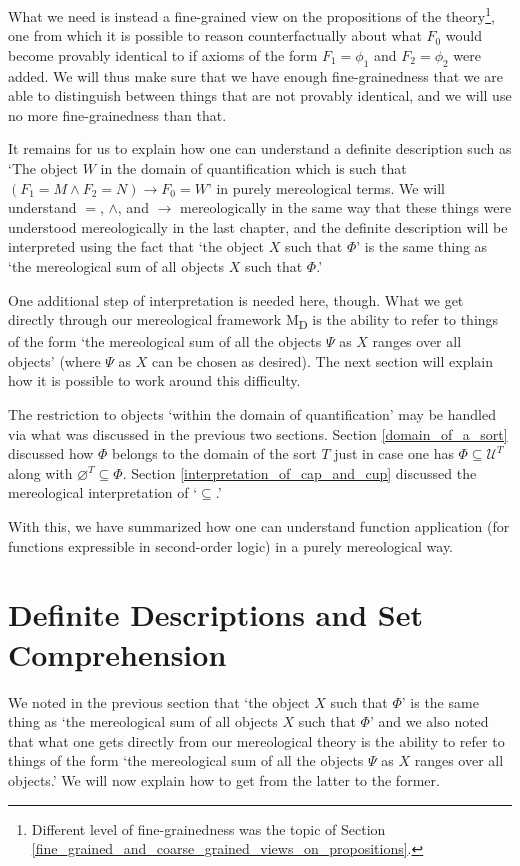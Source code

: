 \documentclass[12pt]{book}
\begin{document}
What we need is instead a fine-grained view on the propositions of the theory\footnote{Different level of fine-grainedness was the topic of Section \ref{fine_grained_and_coarse_grained_views_on_propositions}.}, one from which it is possible to reason counterfactually about what $F_0$ would become provably identical to if axioms of the form $F_1 = \phi_1$ and $F_2 = \phi_2$ were added. We will thus make sure that we have enough fine-grainedness that we are able to distinguish between things that are not provably identical, and we will use no more fine-grainedness than that.

It remains for us to explain how one can understand a definite description such as `The object $W$ in the domain of quantification which is such that $(F_1 = M \wedge F_2 = N) \rightarrow F_0 = W$’ in purely mereological terms. We will understand $=$, $\wedge$, and $\rightarrow$ mereologically in the same way that these things were understood mereologically in the last chapter, and the definite description will be interpreted using the fact that `the object $X$ such that $\Phi$’ is the same thing as `the mereological sum of all objects $X$ such that $\Phi$.’

One additional step of interpretation is needed here, though. What we get directly through our mereological framework M\textsubscript{D} is the ability to refer to things of the form `the mereological sum of all the objects $\Psi$ as $X$ ranges over all objects’ (where $\Psi$ as $X$ can be chosen as desired). The next section will explain how it is possible to work around this difficulty.

The restriction to objects `within the domain of quantification' may be handled via what was discussed in the previous two sections. Section \ref{domain_of_a_sort} discussed how $\Phi$ belongs to the domain of the sort $T$ just in case one has $\Phi \subseteq \mathcal{U}^T$ along with $\varnothing^T \subseteq \Phi$. Section \ref{interpretation_of_cap_and_cup} discussed the mereological interpretation of `$\subseteq$.'

With this, we have summarized how one can understand function application (for functions expressible in second-order logic) in a purely mereological way.

\section{Definite Descriptions and Set Comprehension} \label{definite_descriptions}
We noted in the previous section that `the object $X$ such that $\Phi$’ is the same thing as `the mereological sum of all objects $X$ such that $\Phi$’ and we also noted that what one gets directly from our mereological theory is the ability to refer to things of the form `the mereological sum of all the objects $\Psi$ as $X$ ranges over all objects.’ We will now explain how to get from the latter to the former.
\end{document}
